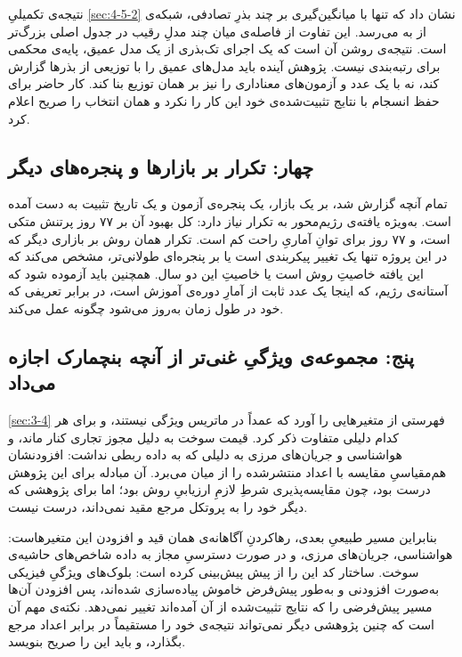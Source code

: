 نتیجه‌ی تکمیلیِ \cref{sec:4-5-2} نشان داد که تنها با میانگین‌گیری بر چند بذرِ
تصادفی،  شبکه‌ی  از  به  می‌رسد. این
تفاوت از فاصله‌ی میان چند مدلِ رقیب در جدول اصلی بزرگ‌تر است. نتیجه‌ی روشن آن
است که یک اجرای تک‌بذری از یک مدل عمیق، پایه‌ی محکمی برای رتبه‌بندی نیست.
پژوهش آینده باید مدل‌های عمیق را با توزیعی از بذرها گزارش کند، نه با یک عدد 
و آزمون‌های معناداری را نیز بر همان توزیع بنا کند. کار حاضر برای حفظ انسجام با
نتایج تثبیت‌شده‌ی خود این کار را نکرد و همان انتخاب را صریح اعلام کرد.

\subsection*{چهار: تکرار بر بازارها و پنجره‌های دیگر}

تمام آنچه گزارش شد، بر یک بازار، یک پنجره‌ی آزمون و یک تاریخ تثبیت به دست آمده
است. به‌ویژه یافته‌ی رژیم‌محور به تکرار نیاز دارد: کل بهبود آن بر ۷۷ روز پرتنش
متکی است، و ۷۷ روز برای توانِ آماریِ راحت کم است. تکرار همان روش بر بازاری دیگر
 که در این پروژه تنها یک تغییر پیکربندی است  یا بر پنجره‌ای طولانی‌تر،
مشخص می‌کند که این یافته خاصیتِ روش است یا خاصیتِ این دو سال. همچنین باید آزموده
شود که آستانه‌ی رژیم، که اینجا یک عدد ثابت از آمارِ دوره‌ی آموزش است، در برابر
تعریفی که خود در طول زمان به‌روز می‌شود چگونه عمل می‌کند.

\subsection*{پنج: مجموعه‌ی ویژگیِ غنی‌تر از آنچه بنچمارک اجازه می‌داد}

\cref{sec:3-4} فهرستی از متغیرهایی را آورد که عمداً در ماتریس ویژگی نیستند، و
برای هر کدام دلیلی متفاوت ذکر کرد. قیمت سوخت به دلیل مجوز تجاری کنار ماند، و
هواشناسی و جریان‌های مرزی به دلیلی که به داده ربطی نداشت: افزودنشان هم‌مقیاسیِ
مقایسه با اعداد منتشرشده را از میان می‌برد. آن مبادله برای این پژوهش درست بود،
چون مقایسه‌پذیری شرطِ لازمِ ارزیابیِ روش بود؛ اما برای پژوهشی که دیگر خود را به
پروتکل مرجع مقید نمی‌داند، درست نیست.

بنابراین مسیر طبیعیِ بعدی، رهاکردنِ آگاهانه‌ی همان قید و افزودن این متغیرهاست:
هواشناسی، جریان‌های مرزی، و  در صورت دسترسیِ مجاز به داده  شاخص‌های
حاشیه‌ی سوخت. ساختار کد این را از پیش پیش‌بینی کرده است: بلوک‌های ویژگیِ فیزیکی
به‌صورت افزودنی و به‌طور پیش‌فرض خاموش پیاده‌سازی شده‌اند، پس افزودن آن‌ها مسیر
پیش‌فرضی را که نتایج تثبیت‌شده از آن آمده‌اند تغییر نمی‌دهد. نکته‌ی مهم آن است که
چنین پژوهشی دیگر نمی‌تواند نتیجه‌ی خود را مستقیماً در برابر اعداد مرجع بگذارد، و
باید این را صریح بنویسد.

